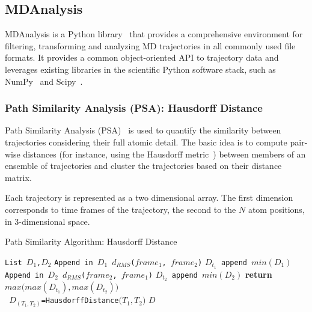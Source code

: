 \subsection{MDAnalysis}
\label{sec:mda}
MDAnalysis is a Python library~\cite{michaud2011mdanalysis,gowers2016mdanalysis} that provides a comprehensive environment for filtering, transforming and analyzing MD trajectories in all commonly used file formats.
It provides a common object-oriented API to trajectory data and leverages existing libraries in the scientific Python software stack, such as NumPy~\cite{numpy} and Scipy~\cite{scipy}.

\subsubsection{Path Similarity Analysis (PSA): Hausdorff Distance}Path Similarity Analysis (PSA)~\cite{seyler2015path} is used to quantify the similarity between trajectories considering their full atomic detail.
The basic idea is to compute pair-wise distances (for instance, using the Hausdorff metric~\cite{huttenlocher1993comparing}) between members of an ensemble of trajectories and cluster the trajectories based on their distance matrix.

Each trajectory is represented as a two dimensional array.
The first dimension corresponds to time frames of the trajectory, the second to the $N$ atom positions, in 3-dimensional space.

\begin{algorithm}[ht]
    \scriptsize
    \caption{Path Similarity Algorithm: Hausdorff Distance}
    \label{alg:hausdorff}
    \begin{algorithmic}[1]
        \State \texttt{List $D_1$,$D_2$}
        \State \texttt{Append in $D_1$ $d_{RMS}$($frame_1$, $frame_2$)}
        \EndFor
        \State \texttt{$D_{t_1}$ append $min(D_1)$}
        \EndFor
        \State \texttt{Append in $D_2$ $d_{RMS}$($frame_2$, $frame_1$)}
        \EndFor
        \State\texttt{$D_{t_2}$ append $min(D_2)$}
        \EndFor
        \State \textbf{return} $max\Big(max(D_{t_1}),max(D_{t_2})\Big)$
        \EndProcedure
        \\        
        \State \texttt{ $D_{( T_1,T_2 )}$=HausdorffDistance$\Big( T_1,T_2 \Big)$} 
        \EndFor
        \EndFor
        \State \Return $D$
        \EndProcedure
    \end{algorithmic}
\end{algorithm}

